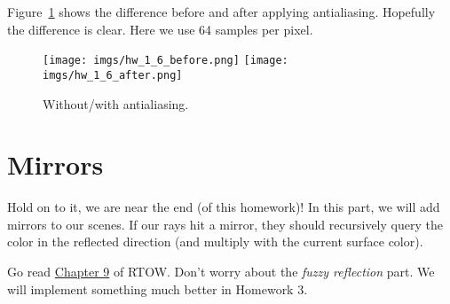 Figure~\ref{fig:hw_1_6} shows the difference before and after applying antialiasing. Hopefully the difference is clear. Here we use 64 samples per pixel.

\begin{figure}[ht]
    \centering
    \texttt{[image: imgs/hw\_1\_6\_before.png]}
    \texttt{[image: imgs/hw\_1\_6\_after.png]}
    \caption{Without/with antialiasing.}
    \label{fig:hw_1_6}
\end{figure}

\section{Mirrors}
Hold on to it, we are near the end (of this homework)! In this part, we will add mirrors to our scenes. If our rays hit a mirror, they should recursively query the color in the reflected direction (and multiply with the current surface color).

Go read \href{https://raytracing.github.io/books/RayTracingInOneWeekend.html#metal}{Chapter 9} of RTOW. Don't worry about the \emph{fuzzy reflection} part. We will implement something much better in Homework 3.



%
%


